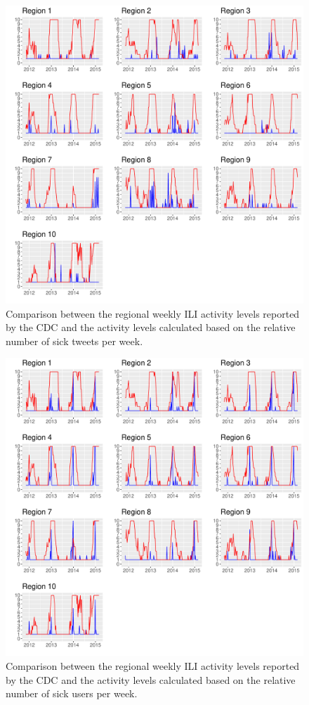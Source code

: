 \documentclass[11pt, a4paper,twoside]{report}\usepackage[]{graphicx}\usepackage[]{color}
\begin{document}
\begin{figure}[htbp!]
\centering
  \includegraphics[width=1\linewidth]{36_cdc_twitter_comp_regs_activity_sick.pdf}
  \caption{Comparison between the regional weekly ILI activity levels reported by the CDC and the activity levels calculated based on the relative number of sick tweets per week.}
    \label{fig:cdc_tw_comp_regs_ac_sick}
\end{figure}

\begin{figure}[htbp!]
\centering
  \includegraphics[width=1\linewidth]{37_cdc_twitter_comp_regs_activity_sick_user.pdf}
  \caption{Comparison between the regional weekly ILI activity levels reported by the CDC and the activity levels calculated based on the relative number of sick users per week.}
    \label{fig:cdc_tw_comp_regs_ac_sick_user}
\end{figure}\clearpage
\end{document}
